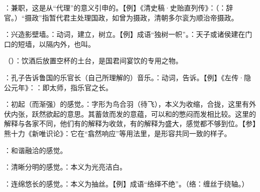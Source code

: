{\item {}：兼职，这是从“代理”的意义引申的。【例】《清史稿·史贻直列传》：（：辞官。）“摄政”指暂代君主处理国政，如曾为摄政，清朝多尔衮为顺治帝摄政。
\item {}：兴造影壁墙。：动词，建立，树立。【例】成语“独树一帜”。：天子或诸侯建在门口的短墙，以隔内外，也叫。
\item {}（）：饮酒后放置空杯的土台，是国君间宴饮的专用之物。
}
{}


{
\item {}：孔子告诉鲁国的乐官长（自己所理解的）音乐。：动词，告诉。【例】《左传·隐公元年》：：即太师，指乐官之长。
\item {}：初起（而渐强）的感觉。：字形为鸟合羽（待飞），本义为收缩，合拢，这里有外伏内张，跃然欲起的意思。其蓄敛而发的意蕴，可以和的憋闷而发相比较。这里的解释与各家不同，他们有的解释为收敛，有的解释为盛大，感觉都不够到位。【参】熊十力《新唯识论》：它在“翕然响应”等用法里，是形容共同一致的样子。
\item {}：和谐融洽的感觉。
\item {}：清晰分明的感觉。：本义为光亮洁白。
\item {}：连绵悠长的感觉。：本义为抽丝。【例】成语“络绎不绝”。（络：缠丝于绕轴。）
}
{}


